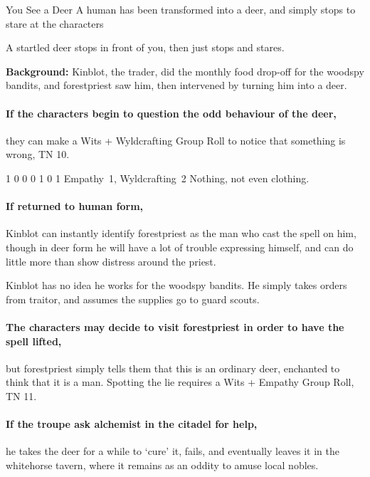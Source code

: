 \forestpriest

{You See a Deer}%
{A human has been transformed into a deer, and simply stops to stare at the characters}%
\label{seeADeer}

\begin{boxtext}

  A startled deer stops in front of you, then just stops and stares.

\end{boxtext}

\textbf{Background:}
Kinblot, the trader, did the monthly food drop-off for the woodspy bandits, and \gls{forestpriest} saw him, then intervened by turning him into a deer.

\paragraph{If the characters begin to question the odd behaviour of the deer,}
they can make a Wits + Wyldcrafting Group Roll to notice that something is wrong, TN 10.

  {1}%
  {0}%
  {{0}%
  {0}%
  {1}}%
  {0}%
  {1}%
  {Empathy~1, Wyldcrafting~2}%
  {Nothing, not even clothing.}%
  {}

\paragraph{If returned to human form,}
Kinblot can instantly identify \gls{forestpriest} as the man who cast the spell on him, though in deer form he will have a lot of trouble expressing himself, and can do little more than show distress around the priest.

Kinblot has no idea he works for the woodspy bandits.
He simply takes orders from \gls{traitor}, and assumes the supplies go to \gls{guard} scouts.

\paragraph{The characters may decide to visit \gls{forestpriest} in order to have the spell lifted,}
but \gls{forestpriest} simply tells them that this is an ordinary deer, enchanted to think that it is a man.
Spotting the lie requires a Wits + Empathy Group Roll, TN 11.

\label{deerDropOff}
\paragraph{If the troupe ask \gls{alchemist} in the citadel for help,}
he takes the deer for a while to `cure' it, fails, and eventually leaves it in the \gls{whitehorse} tavern, where it remains as an oddity to amuse local nobles.

